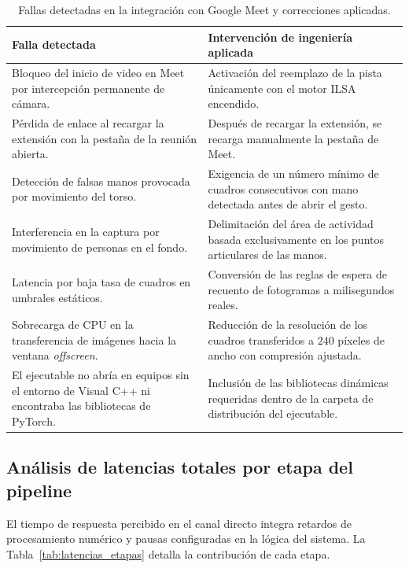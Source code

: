 \begin{table}[H]
    \centering
    \small
    \caption{Fallas detectadas en la integración con Google Meet y correcciones aplicadas.}
    \label{tab:fallas_integracion}
    \begin{tabularx}{\textwidth}{@{}>{\raggedright\arraybackslash}p{} >{\raggedright\arraybackslash}X@{}}
        \toprule
        \textbf{Falla detectada} & \textbf{Intervención de ingeniería aplicada} \\
        \midrule
        Bloqueo del inicio de video en Meet por intercepción permanente de cámara. & Activación del reemplazo de la pista únicamente con el motor ILSA encendido. \\
        \addlinespace[2pt]
        Pérdida de enlace al recargar la extensión con la pestaña de la reunión abierta. & Después de recargar la extensión, se recarga manualmente la pestaña de Meet. \\
        \addlinespace[2pt]
        Detección de falsas manos provocada por movimiento del torso. & Exigencia de un número mínimo de cuadros consecutivos con mano detectada antes de abrir el gesto. \\
        \addlinespace[2pt]
        Interferencia en la captura por movimiento de personas en el fondo. & Delimitación del área de actividad basada exclusivamente en los puntos articulares de las manos. \\
        \addlinespace[2pt]
        Latencia por baja tasa de cuadros en umbrales estáticos. & Conversión de las reglas de espera de recuento de fotogramas a milisegundos reales. \\
        \addlinespace[2pt]
        Sobrecarga de CPU en la transferencia de imágenes hacia la ventana \textit{offscreen}. & Reducción de la resolución de los cuadros transferidos a $240$ píxeles de ancho con compresión ajustada. \\
        \addlinespace[2pt]
        El ejecutable no abría en equipos sin el entorno de Visual C++ ni encontraba las bibliotecas de PyTorch. & Inclusión de las bibliotecas dinámicas requeridas dentro de la carpeta de distribución del ejecutable. \\
        \bottomrule
    \end{tabularx}
\end{table}

\subsection{Análisis de latencias totales por etapa del pipeline}
\label{sec:latencias_pipeline}
El tiempo de respuesta percibido en el canal directo integra retardos de procesamiento numérico y pausas configuradas en la lógica del sistema. La Tabla~\ref{tab:latencias_etapas} detalla la contribución de cada etapa.

